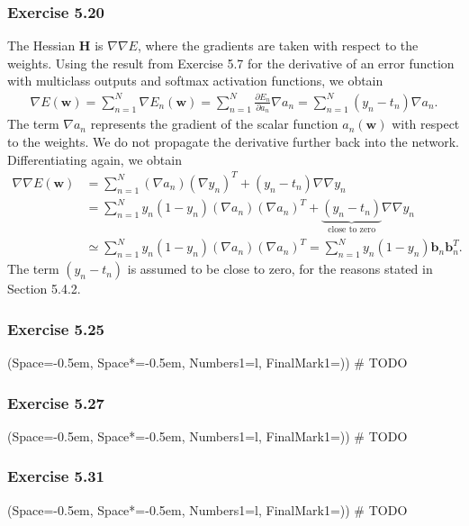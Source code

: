 \documentclass[12pt, a4paper]{article}
\newcommand{\listSpace}{-0.5em}%
\newcommand{\vect}[1]{\bm{#1}}
\begin{document}
\subsubsection*{Exercise 5.20}
The Hessian $\vect{H}$ is $\nabla \nabla E$, where the gradients are taken with respect to the weights.
Using the result from Exercise 5.7 for the derivative of an error function with multiclass outputs and softmax activation functions, we obtain
\begin{align*}
	\nabla E(\vect{w}) = 
	\sum_{n=1}^{N} \nabla E_n(\vect{w})
	=
	\sum_{n=1}^{N} \frac{\partial E_n }{\partial a_n} \nabla a_n
	=
	\sum_{n=1}^{N} (y_n - t_n) \nabla a_n.
\end{align*}
The term $\nabla a_n$ represents the gradient of the scalar function $a_n(\vect{w})$ with respect to the weights.
We do not propagate the derivative further back into the network.
Differentiating again, we obtain
\begin{align*}
\nabla \nabla E(\vect{w}) 
& = \sum_{n=1}^{N} \left( \nabla a_n \right) \left( \nabla y_n \right)^T
+ (y_n - t_n) \nabla \nabla y_n \\
& = \sum_{n=1}^{N} y_n (1 - y_n) \left( \nabla a_n \right) \left( \nabla a_n \right)^T
+ \underbrace{(y_n - t_n)}_{\text{close to zero}} \nabla \nabla y_n \\
&\simeq \sum_{n=1}^{N} y_n (1 - y_n) \left( \nabla a_n \right) \left( \nabla a_n \right)^T = \sum_{n=1}^{N} y_n (1 - y_n) \vect{b}_n \vect{b}_n^T
.
\end{align*}
The term $(y_n - t_n)$ is assumed to be close to zero, for the reasons stated in Section 5.4.2.


\subsubsection*{Exercise 5.25}
\begin{easylist}[enumerate]
	\ListProperties(Space=\listSpace, Space*=\listSpace, Numbers1=l, FinalMark1={)})
	# TODO
\end{easylist}

\subsubsection*{Exercise 5.27}
\begin{easylist}[enumerate]
	\ListProperties(Space=\listSpace, Space*=\listSpace, Numbers1=l, FinalMark1={)})
	# TODO
\end{easylist}

\subsubsection*{Exercise 5.31}
\begin{easylist}[enumerate]
	\ListProperties(Space=\listSpace, Space*=\listSpace, Numbers1=l, FinalMark1={)})
	# TODO
\end{easylist}
\end{document}
